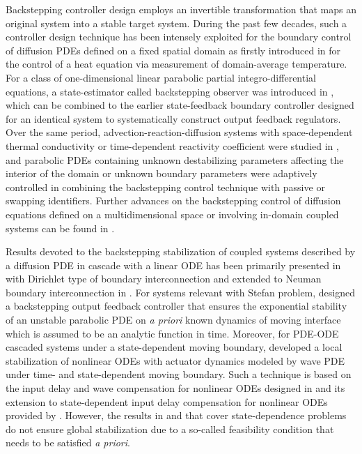 \documentclass[journal]{IEEEtran}
\begin{document}
Backstepping controller design employs  an invertible transformation that  maps an original
 system into a stable target system. During the past few decades, such a controller design technique has been intensely exploited for the boundary control of diffusion  PDEs defined on a fixed spatial domain as firstly introduced in  \cite{Dejan2001} for the control of a heat equation via measurement of domain-average temperature. For a class of one-dimensional linear parabolic partial integro-differential equations, a state-estimator called backstepping observer was introduced in \cite{Smyshlyaev2005}, which can be combined to the earlier state-feedback boundary controller designed for an identical system \cite{Smyshlyaev2004} to systematically construct output feedback regulators. Over the same period, advection-reaction-diffusion systems with space-dependent thermal conductivity or time-dependent reactivity coefficient were studied in \cite{Smyshlyaev2005b}, and parabolic PDEs containing unknown destabilizing parameters affecting the
interior of the domain or unknown boundary parameters  were adaptively controlled in  \cite{Krstic2008adap,Krstic2008adap2,Krstic2008adap3} combining the backstepping control technique with passive or swapping identifiers. Further advances  on the backstepping control of diffusion equations defined on a multidimensional space or involving in-domain coupled systems can  be found in \cite{Baccoli2015,Deut2016,Vazquez2017,Vazquez2017b}.  

Results devoted to the backstepping stabilization of coupled systems described by a diffusion PDE in cascade with a linear ODE has been primarily presented in \cite{krstic09} with Dirichlet type of boundary interconnection and extended to Neuman boundary interconnection in \cite{susto10, tang11}. For systems relevant with Stefan problem, \cite{Izadi15} designed a backstepping output feedback controller that ensures the exponential stability of an unstable parabolic PDE on \emph{a priori} known dynamics of moving interface which is assumed to be an analytic function in time. Moreover, for PDE-ODE cascaded systems under a state-dependent moving boundary, \cite{Cai2015} developed a local stabilization of nonlinear ODEs with actuator dynamics modeled by wave PDE under time- and state-dependent moving boundary. Such a technique is based on the input delay and wave compensation for nonlinear ODEs designed in \cite{krstic2010, bekiaris2014wave} and its extension to state-dependent input delay compensation for nonlinear ODEs provided by \cite{bekiaris2013compensation}. However, the results in \cite{Cai2015} and \cite{bekiaris2013compensation} that cover state-dependence problems do not ensure global stabilization due to a so-called feasibility condition that needs to be satisfied \emph{a priori}. 
\end{document}
